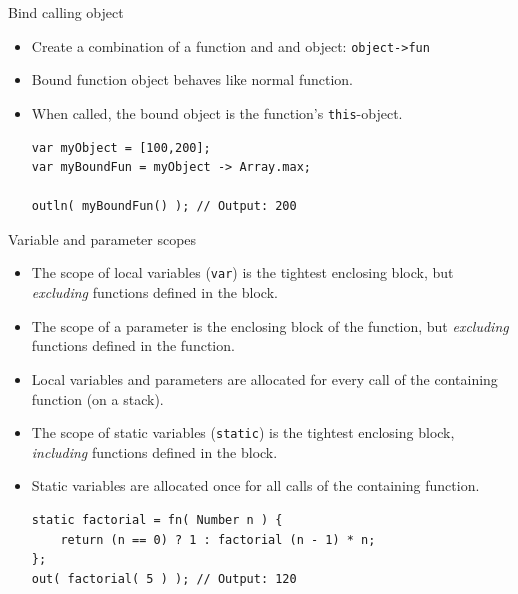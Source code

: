 \documentclass[ucs,9pt]{beamer}
\begin{document}
\begin{frame}[fragile]{Bind calling object}
	\begin{itemize}
	\item Create a combination of a function and and object: \lstinline!object->fun!
	\item Bound function object behaves like normal function.
	\item When called, the bound object is the function's \lstinline!this!-object.
		\begin{lstlisting}
var myObject = [100,200];
var myBoundFun = myObject -> Array.max;

outln( myBoundFun() ); // Output: 200
		\end{lstlisting}
		\end{itemize}
\end{frame}

\begin{frame}[fragile]{Variable and parameter scopes}
	\begin{itemize}
	\item The scope of local variables (\lstinline!var!) is the tightest enclosing block, but \emph{excluding} functions defined in the block.
	\item The scope of a parameter is the enclosing block of the function, but \emph{excluding} functions defined in the function.
	\item Local variables and parameters are allocated for every call of the containing function (on a stack).
		\pause
	\item The scope of static variables (\lstinline!static!) is the tightest enclosing block, \emph{including} functions defined in the block.
	\item Static variables are allocated once for all calls of the containing function.
	\pause
			\begin{lstlisting}
static factorial = fn( Number n ) {
    return (n == 0) ? 1 : factorial (n - 1) * n;
};
out( factorial( 5 ) ); // Output: 120
		\end{lstlisting}
	\end{itemize}
		
\end{frame}

\end{document}
